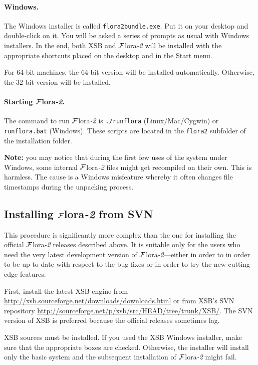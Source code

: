 \documentclass[11pt]{article}
\newcommand{\FLSYSTEM}{{\mbox{\sc ${\cal F}${lora}\rm\emph{-2}}}\xspace}
\newcommand{\ENGINERUN}{runflora}
\begin{document}
{\paragraph{Windows.}
The Windows installer is called \texttt{flora2bundle.exe}.
Put it on your desktop and double-click on it. You will be asked a series
of prompts as usual with Windows installers. In the end, both XSB and 
\FLSYSTEM will be installed with the appropriate shortcuts placed on the
desktop and in the Start menu.

For 64-bit machines, the 64-bit version will be installed
automatically. Otherwise, the 32-bit version will be installed.

\paragraph{Starting \FLSYSTEM.}
The command to run \FLSYSTEM is \texttt{./\ENGINERUN} (Linux/Mac/Cygwin)
or \texttt{\ENGINERUN.bat} (Windows). These scripts are located in the
\texttt{flora2} subfolder of the installation folder. 

\textbf{Note:} you may notice that during the first few uses of the system
under Windows, some internal \FLSYSTEM files might get recompiled on their
own. This is harmless. The cause is a Windows misfeature whereby it often
changes file timestamps during the unpacking process.


\subsection{Installing \FLSYSTEM from SVN}

This procedure is significantly more complex than the one for installing
the official \FLSYSTEM releases described above. It is suitable only for the
users who need the very latest development version of \FLSYSTEM---either in
order to in order to be up-to-date with respect to the bug fixes or in
order to try the new cutting-edge features.

First, install the latest XSB engine from
\url{http://xsb.sourceforge.net/downloads/downloads.html} or from XSB's SVN
repository \url{http://sourceforge.net/p/xsb/src/HEAD/tree/trunk/XSB/}.
The SVN version of XSB is preferred because the official releases sometimes
lag.

XSB sources must be installed.
If you used the XSB Windows installer,
make sure that the appropriate boxes are checked. Otherwise, the installer
will install only the basic system and the subsequent installation of
\FLSYSTEM might fail.

}
\end{document}
